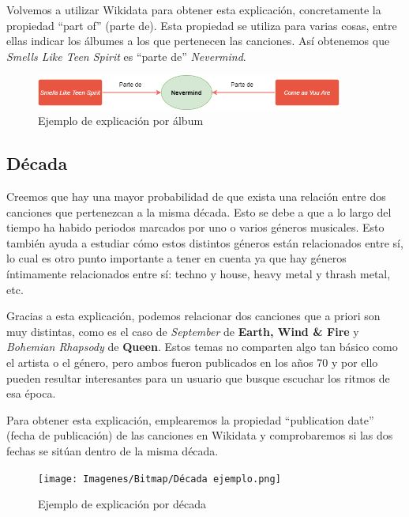 Volvemos a utilizar Wikidata para obtener esta explicación, concretamente la propiedad ``part of'' (parte de). Esta propiedad se utiliza para varias cosas, entre ellas indicar los álbumes a los que pertenecen las canciones. Así obtenemos que \textit{Smells Like Teen Spirit} es ``parte de'' \textit{Nevermind}.\\

\begin{figure}[h!]
	\centering
	\includegraphics[width = 0.9\textwidth]{Imagenes/Bitmap/Álbum ejemplo.png}
	\caption{Ejemplo de explicación por álbum}
	\label{fig:sampleImage}
\end{figure}

\subsection*{Década}

Creemos que hay una mayor probabilidad de que exista una relación entre dos canciones que pertenezcan a la misma década. Esto se debe a que a lo largo del tiempo ha habido periodos marcados por uno o varios géneros musicales. Esto también ayuda a estudiar cómo estos distintos géneros están relacionados entre sí, lo cual es otro punto importante a tener en cuenta ya que hay géneros íntimamente relacionados entre sí: techno y house, heavy metal y thrash metal, etc.

Gracias a esta explicación, podemos relacionar dos canciones que a priori son muy distintas, como es el caso de \textit{September} de \textbf{Earth, Wind \& Fire} y \textit{Bohemian Rhapsody} de \textbf{Queen}. Estos temas no comparten algo tan básico como el artista o el género, pero ambos fueron publicados en los años 70 y por ello pueden resultar interesantes para un usuario que busque escuchar los ritmos de esa época.

Para obtener esta explicación, emplearemos la propiedad ``publication date'' (fecha de publicación) de las canciones en Wikidata y comprobaremos si las dos fechas se sitúan dentro de la misma década.\\

\begin{figure}[h!]
	\centering
	\texttt{[image: Imagenes/Bitmap/Década ejemplo.png]}
	\caption{Ejemplo de explicación por década}
	\label{fig:sampleImage}
\end{figure}

